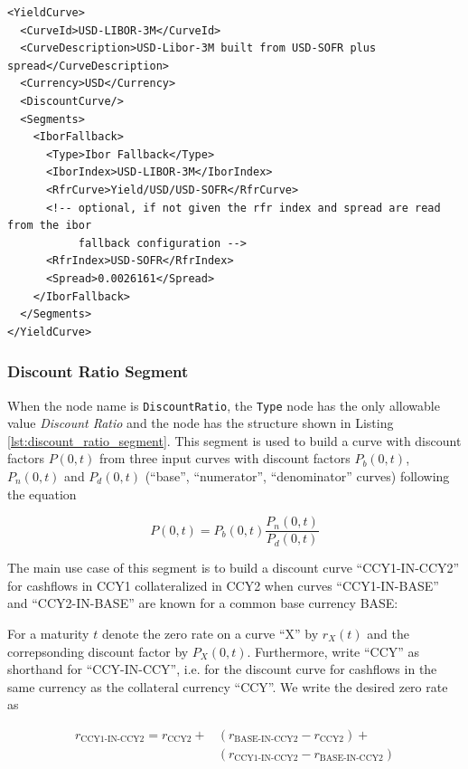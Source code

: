 \begin{listing}[H]
\begin{verbatim}
<YieldCurve>
  <CurveId>USD-LIBOR-3M</CurveId>
  <CurveDescription>USD-Libor-3M built from USD-SOFR plus spread</CurveDescription>
  <Currency>USD</Currency>
  <DiscountCurve/>
  <Segments>
    <IborFallback>
      <Type>Ibor Fallback</Type>
      <IborIndex>USD-LIBOR-3M</IborIndex>
      <RfrCurve>Yield/USD/USD-SOFR</RfrCurve>
      <!-- optional, if not given the rfr index and spread are read from the ibor
           fallback configuration -->
      <RfrIndex>USD-SOFR</RfrIndex>
      <Spread>0.0026161</Spread>
    </IborFallback>
  </Segments>
</YieldCurve>
\end{verbatim}
\caption{Ibor fallback segment}
\label{lst:ibor_fallback_segment}
\end{listing}

\subsubsection*{Discount Ratio Segment}
\label{sec:discount_ratio_segment}

When the node name is \lstinline!DiscountRatio!, the \lstinline!Type! node has the only allowable value \emph{Discount
Ratio} and the node has the structure shown in Listing \ref{lst:discount_ratio_segment}. This segment is used to build a
curve with discount factors $P(0,t)$ from three input curves with discount factors $P_b(0,t)$, $P_n(0,t)$ and $P_d(0,t)$
(``base'', ``numerator'', ``denominator'' curves) following the equation

\begin{equation}\label{discount_ratio_df}
  P(0,t) = P_b(0,t) \frac{P_n(0,t)}{P_d(0,t)}
\end{equation}

The main use case of this segment is to build a discount curve ``CCY1-IN-CCY2'' for cashflows in CCY1 collateralized in
CCY2 when curves ``CCY1-IN-BASE'' and ``CCY2-IN-BASE'' are known for a common base currency BASE:

For a maturity $t$ denote the zero rate on a curve ``X'' by $r_X(t)$ and the correpsonding discount factor by
$P_X(0,t)$. Furthermore, write ``CCY'' as shorthand for ``CCY-IN-CCY'', i.e. for the discount curve for cashflows in the
same currency as the collateral currency ``CCY''. We write the desired zero rate as

\begin{equation}\label{discount_ratio_rates}
  \begin{split}
    r_{\text{CCY1-IN-CCY2}} = r_{\text{CCY2}} + & ( r_{\text{BASE-IN-CCY2}} - r_{\text{CCY2}} ) + \\
                               & (r_{\text{CCY1-IN-CCY2}} - r_{\text{BASE-IN-CCY2}})
  \end{split}
\end{equation}


